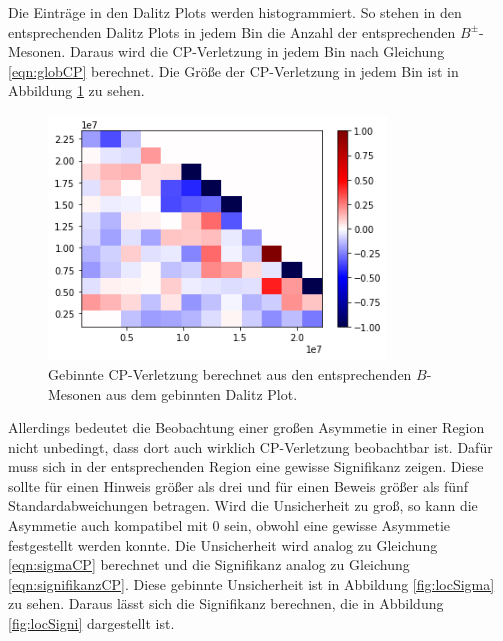 Die Einträge in den Dalitz Plots werden histogrammiert.
So stehen in den entsprechenden Dalitz Plots in jedem Bin die Anzahl der entsprechenden $B^\pm$-Mesonen.
Daraus wird die CP-Verletzung in jedem Bin nach Gleichung \ref{eqn:globCP} berechnet.
Die Größe der CP-Verletzung in jedem Bin ist in Abbildung \ref{fig:locCP} zu sehen.

\begin{figure}
  \centering
  \includegraphics[width=0.8\textwidth]{plots/hist_asymmetrie_dalitz.png}
  \caption{Gebinnte CP-Verletzung berechnet aus den entsprechenden $B$-Mesonen aus dem gebinnten Dalitz Plot.}
  \label{fig:locCP}
\end{figure}

Allerdings bedeutet die Beobachtung einer großen Asymmetie in einer Region nicht unbedingt, dass dort auch wirklich CP-Verletzung beobachtbar ist.
Dafür muss sich in der entsprechenden Region eine gewisse Signifikanz zeigen.
Diese sollte für einen Hinweis größer als drei und für einen Beweis größer als fünf Standardabweichungen betragen.
Wird die Unsicherheit zu groß, so kann die Asymmetie auch kompatibel mit 0 sein, obwohl eine gewisse Asymmetie festgestellt werden konnte.
Die Unsicherheit wird analog zu Gleichung \ref{eqn:sigmaCP} berechnet und die Signifikanz analog zu Gleichung \ref{eqn:signifikanzCP}.
Diese gebinnte Unsicherheit ist in Abbildung \ref{fig:locSigma} zu sehen.
Daraus lässt sich die Signifikanz berechnen, die in Abbildung \ref{fig:locSigni} dargestellt ist.

